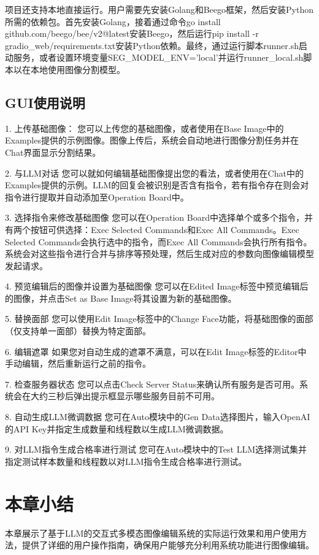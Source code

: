 \documentclass[a4paper,AutoFakeBold,oneside,12pt]{book}
\begin{document}
项目还支持本地直接运行。用户需要先安装Golang和Beego框架，然后安装Python所需的依赖包。首先安装Golang，接着通过命令go install github.com/beego/bee/v2@latest安装Beego，然后运行pip install -r gradio\_web/requirements.txt安装Python依赖。最终，通过运行脚本runner.sh启动服务，或者设置环境变量SEG\_MODEL\_ENV='local'并运行runner\_local.sh脚本以在本地使用图像分割模型。

\subsection{GUI使用说明}
1. 上传基础图像：
您可以上传您的基础图像，或者使用在Base Image中的Examples提供的示例图像。图像上传后，系统会自动地进行图像分割任务并在Chat界面显示分割结果。

2. 与LLM对话
您可以就如何编辑基础图像提出您的看法，或者使用在Chat中的Examples提供的示例。LLM的回复会被识别是否含有指令，若有指令存在则会对指令进行提取并自动添加至Operation Board中。

3. 选择指令来修改基础图像
您可以在Operation Board中选择单个或多个指令，并有两个按钮可供选择：Exec Selected Commands和Exec All Commands。Exec Selected Commands会执行选中的指令，而Exec All Commands会执行所有指令。系统会对这些指令进行合并与排序等预处理，然后生成对应的参数向图像编辑模型发起请求。

4. 预览编辑后的图像并设置为基础图像
您可以在Edited Image标签中预览编辑后的图像，并点击Set as Base Image将其设置为新的基础图像。

5. 替换面部
您可以使用Edit Image标签中的Change Face功能，将基础图像的面部（仅支持单一面部）替换为特定面部。

6. 编辑遮罩
如果您对自动生成的遮罩不满意，可以在Edit Image标签的Editor中手动编辑，然后重新运行之前的指令。

7. 检查服务器状态
您可以点击Check Server Status来确认所有服务是否可用。系统会在大约三秒后弹出提示框显示哪些服务目前不可用。

8. 自动生成LLM微调数据
您可在Auto模块中的Gen Data选择图片，输入OpenAI的API Key并指定生成数量和线程数以生成LLM微调数据。

9. 对LLM指令生成合格率进行测试
您可在Auto模块中的Test LLM选择测试集并指定测试样本数量和线程数以对LLM指令生成合格率进行测试。

\section{本章小结}
本章展示了基于LLM的交互式多模态图像编辑系统的实际运行效果和用户使用方法，提供了详细的用户操作指南，确保用户能够充分利用系统功能进行图像编辑。
\end{document}
